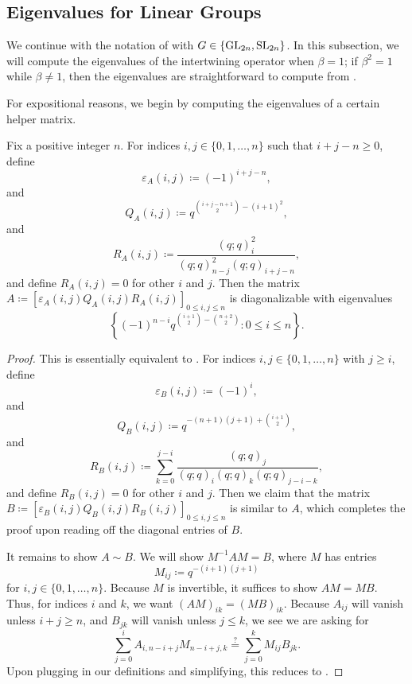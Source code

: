 \subsection{Eigenvalues for Linear Groups}
We continue with the notation of  with $G\in\{\mathrm{GL}_{2n},\mathrm{SL}_{2n}\}$. In this subsection, we will compute the eigenvalues of the intertwining operator when $\beta=1$; if $\beta^2=1$ while $\beta\ne1$, then the eigenvalues are straightforward to compute from .

For expositional reasons, we begin by computing the eigenvalues of a certain helper matrix.
\begin{proposition} \label{prop:gl-helper}
    Fix a positive integer $n$. For indices $i,j\in\{0,1,\ldots,n\}$ such that $i+j-n\ge0$, define
    \[\varepsilon_A(i,j)\coloneqq(-1)^{i+j-n},\]
    and
    \[Q_A(i,j)\coloneqq q^{\binom{i+j-n+1}2-\left(i+1\right)^{2}},\]
    and
    \[R_A(i,j)\coloneqq\frac{(q;q)_i^{2}}{(q;q)_{n-j}^{2}(q;q)_{i+j-n}},\]
    and define $R_A(i,j)=0$ for other $i$ and $j$. Then the matrix $A\coloneqq[\varepsilon_A(i,j)Q_A(i,j)R_A(i,j)]_{0\le i,j\le n}$ is diagonalizable with eigenvalues
    \[\left\{(-1)^{n-i}q^{\binom{i+1}2-\binom{n+2}2}:0\le i\le n\right\}.\]
\end{proposition}
\begin{proof}
    This is essentially equivalent to . For indices $i,j\in\{0,1,\ldots,n\}$ with $j\ge i$, define
    \[\varepsilon_B(i,j)\coloneqq(-1)^i,\]
    and
    \[Q_B(i,j)\coloneqq q^{-(n+1)(j+1)+\binom{i+1}2},\]
    and
    \[R_B(i,j)\coloneqq\sum_{k=0}^{j-i}\frac{(q;q)_j}{(q;q)_i(q;q)_k(q;q)_{j-i-k}},\]
    and define $R_B(i,j)=0$ for other $i$ and $j$. Then we claim that the matrix $B\coloneqq[\varepsilon_B(i,j)Q_B(i,j)R_B(i,j)]_{0\le i,j\le n}$ is similar to $A$, which completes the proof upon reading off the diagonal entries of $B$.

    It remains to show $A\sim B$. We will show $M^{-1}AM=B$, where $M$ has entries
    \[M_{ij}\coloneqq q^{-(i+1)(j+1)}\]
    for $i,j\in\{0,1,\ldots,n\}$. Because $M$ is invertible, it suffices to show $AM=MB$. Thus, for indices $i$ and $k$, we want $(AM)_{ik}=(MB)_{ik}$. Because $A_{ij}$ will vanish unless $i+j\ge n$, and $B_{jk}$ will vanish unless $j\le k$, we see we are asking for
    \[\sum_{j=0}^iA_{i,n-i+j}M_{n-i+j,k}\stackrel?=\sum_{j=0}^kM_{ij}B_{jk}.\]
    Upon plugging in our definitions and simplifying, this reduces to .
\end{proof}
